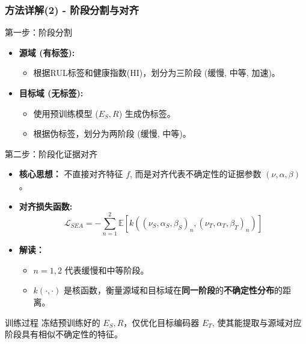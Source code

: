 \documentclass{beamer}
\newcommand{\Lcal}{\mathcal{L}}
\newcommand{\E}{\mathbb{E}}
\begin{document}
\begin{frame}[allowframebreaks]
    \frametitle{方法详解(2) - 阶段分割与对齐}
    \begin{block}{第一步：阶段分割}
        \begin{itemize}
            \item \textbf{源域 (有标签):}
            \begin{itemize}
                \item 根据RUL标签和健康指数(HI)，划分为三阶段 (缓慢, 中等, 加速)。
            \end{itemize}
            \item \textbf{目标域 (无标签):}
            \begin{itemize}
                \item 使用预训练模型 ($E_S, R$) 生成\alert{伪标签}。
                \item 根据伪标签，划分为两阶段 (缓慢, 中等)。
                \end{itemize}
            \end{itemize}
        \end{block}
    \begin{block}{第二步：阶段化证据对齐}
        \begin{itemize}
            \item \textbf{核心思想：}
            不直接对齐特征 $f$, 而是对齐代表\alert{不确定性}的证据参数 $(\nu, \alpha, \beta)$。
            \item \textbf{对齐损失函数:}
            $$ \Lcal_{SEA} = -\sum_{n=1}^{2}\E[k((\nu_S, \alpha_S, \beta_S)_n, (\nu_T, \alpha_T, \beta_T)_n)] $$
            \item \textbf{解读：}
            \begin{itemize}
                \item $n=1, 2$ 代表缓慢和中等阶段。
                \item $k(\cdot, \cdot)$ 是核函数，衡量源域和目标域在\textbf{同一阶段}的\textbf{不确定性分布}的距离。
            \end{itemize}
        \end{itemize}
    \end{block}
    \vfill
    \begin{block}{训练过程}
        冻结预训练好的 $E_S, R$，仅优化目标编码器 \alert{$E_T$}, 使其能提取与源域对应阶段具有相似不确定性的特征。
    \end{block}
\end{frame}
\end{document}
